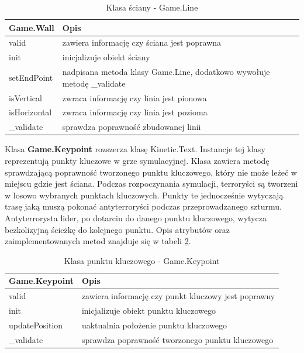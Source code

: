 \begin{table}
\begin{center}
\begin{tabular}{|p{}|p{}|}
\hline
\textbf{Game.Wall} & Opis\\\hline		
	valid & zawiera informację czy ściana jest poprawna
\\\hline
	init & inicjalizuje obiekt ściany\\
	setEndPoint & nadpisana metoda klasy Game.Line, dodatkowo wywołuje metodę \_validate\\
	isVertical & zwraca informację czy linia jest pionowa\\
	isHorizontal & zwraca informację czy linia jest pozioma\\
	\_validate & sprawdza poprawność zbudowanej linii
\\\hline
\end{tabular}
\caption {Klasa ściany - Game.Line\label{objectsGameWall}}
\end{center}
\end{table} 

Klasa \textbf{Game.Keypoint} rozszerza klasę Kinetic.Text. Instancje tej klasy reprezentują punkty kluczowe w grze symulacyjnej. Klasa zawiera metodę sprawdzającą poprawność tworzonego punktu kluczowego, który nie może leżeć w miejscu gdzie jest ściana. Podczas rozpoczynania symulacji, terroryści są tworzeni w losowo wybranych punktach kluczowych. Punkty te jednocześnie wytyczają trasę jaką muszą pokonać antyterroryści podczas przeprowadzanego szturmu. Antyterrorysta lider, po dotarciu do danego punktu kluczowego, wytycza bezkolizyjną ścieżkę do kolejnego punktu. Opis atrybutów oraz zaimplementowanych metod znajduje się w tabeli \ref{objectsGameKeypoint}. 

\begin{table}
\begin{center}
\begin{tabular}{|p{}|p{}|}
\hline
\textbf{Game.Keypoint} & Opis\\\hline		
	valid & zawiera informację czy punkt kluczowy jest poprawny
\\\hline
	init & inicjalizuje obiekt punktu kluczowego\\
	updatePosition & uaktualnia położenie punktu kluczowego\\
	\_validate & sprawdza poprawność tworzonego punktu kluczowego
\\\hline
\end{tabular}
\caption {Klasa punktu kluczowego - Game.Keypoint\label{objectsGameKeypoint}}
\end{center}
\end{table} 

